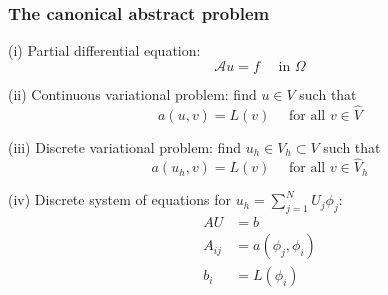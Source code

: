 \begin{frame}
  \frametitle{The canonical abstract problem}

  (i) Partial differential equation:
  \begin{equation*}
    \mathcal{A} u = f \quad \text{ in } \Omega
  \end{equation*}

  (ii) Continuous variational problem: find $u \in V$ such that
  \begin{equation*}
    a(u, v) = L(v) \quad \text{ for all } v \in \hat{V}
  \end{equation*}

  (iii) Discrete variational problem: find $u_h \in V_h \subset
  V$ such that
  \begin{equation*}
    a(u_h, v) = L(v) \quad \text{ for all } v \in \hat{V}_h
  \end{equation*}

  (iv) Discrete system of equations for $u_h = \sum_{j=1}^N
  U_j \phi_j$:
  \begin{align*}
    A U &= b \\
    A_{ij} &= a(\phi_j, \phi_i) \\
    b_i   &= L(\phi_i)
  \end{align*}

\end{frame}
